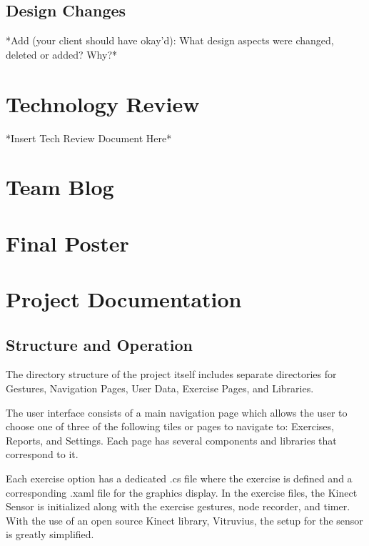 \documentclass[onecolumn, draftclsnofoot,10pt, compsoc]{IEEEtran}
\begin{document}
\subsection{Design Changes}
*Add (your client should have okay'd): What design aspects were changed, deleted or added? Why?*

\section{Technology Review}
*Insert Tech Review Document Here*



\section{Team Blog}

\section{Final Poster}
  
\section{Project Documentation}
\subsection{Structure and Operation}
The directory structure of the project itself includes separate directories for Gestures, Navigation Pages, User Data, Exercise Pages, and Libraries. 

The user interface consists of a main navigation page which allows the user to choose one of three of the following tiles or pages to navigate to: Exercises, Reports, and Settings. Each page has several components and libraries that correspond to it. 

Each exercise option has a dedicated .cs file where the exercise is defined and a corresponding .xaml file for the graphics display. In the exercise files, the Kinect Sensor is initialized along with the exercise gestures, node recorder, and timer. With the use of an open source Kinect library, Vitruvius, the setup for the sensor is greatly simplified. 
\end{document}
